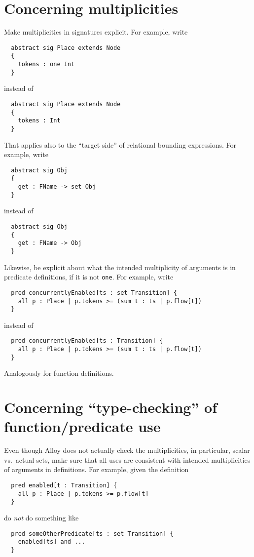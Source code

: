 \documentclass{article}
\begin{document}
\section*{Concerning multiplicities}

Make multiplicities in signatures explicit.
For example, write
\begin{lstlisting}
  abstract sig Place extends Node
  {
    tokens : one Int
  }
\end{lstlisting}
instead of
\begin{lstlisting}
  abstract sig Place extends Node
  {
    tokens : Int
  }
\end{lstlisting}
That applies also to the ``target side'' of relational bounding expressions.
For example, write
\begin{lstlisting}
  abstract sig Obj
  {
    get : FName -> set Obj
  }
\end{lstlisting}
instead of
\begin{lstlisting}
  abstract sig Obj
  {
    get : FName -> Obj
  }
\end{lstlisting}
Likewise, be explicit about what the intended multiplicity of arguments is in predicate definitions, if it is not \lstinline|one|.
For example, write
\begin{lstlisting}
  pred concurrentlyEnabled[ts : set Transition] {
    all p : Place | p.tokens >= (sum t : ts | p.flow[t])
  }
\end{lstlisting}
instead of
\begin{lstlisting}
  pred concurrentlyEnabled[ts : Transition] {
    all p : Place | p.tokens >= (sum t : ts | p.flow[t])
  }
\end{lstlisting}
Analogously for function definitions.

\section*{Concerning ``type-checking'' of function/predicate use}

Even though Alloy does not actually check the multiplicities, in particular, scalar vs.\ actual sets, make sure that all uses are consistent with intended multiplicities of arguments in definitions.
For example, given the definition
\begin{lstlisting}
  pred enabled[t : Transition] {
    all p : Place | p.tokens >= p.flow[t]
  }
\end{lstlisting}
do \emph{not} do something like
\begin{lstlisting}
  pred someOtherPredicate[ts : set Transition] {
    enabled[ts] and ...
  }
\end{lstlisting}
\end{document}
